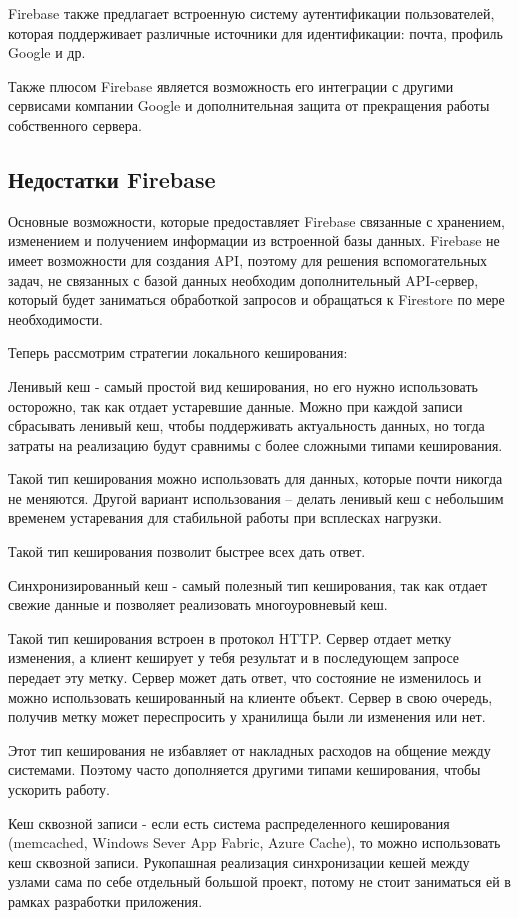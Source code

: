 Firebase также предлагает встроенную систему аутентификации пользователей, которая поддерживает различные источники для идентификации: почта, профиль Google и др.

Также плюсом Firebase является возможность его интеграции с другими сервисами компании Google и дополнительная защита от прекращения работы собственного сервера.

\subsection{Недостатки Firebase}
Основные возможности, которые предоставляет Firebase связанные с хранением, изменением и получением информации из встроенной базы данных. Firebase не имеет возможности для создания API, поэтому для решения вспомогательных задач, не связанных с базой данных необходим дополнительный API-cервер, который будет заниматься обработкой запросов и обращаться к Firestore по мере необходимости.

Теперь рассмотрим стратегии локального кеширования:

Ленивый кеш - самый простой вид кеширования, но его нужно использовать осторожно, так как отдает устаревшие данные. Можно при каждой записи сбрасывать ленивый кеш, чтобы поддерживать актуальность данных, но тогда затраты на реализацию будут сравнимы с более сложными типами кеширования.

Такой тип кеширования можно использовать для данных, которые почти никогда не меняются. Другой вариант использования – делать ленивый кеш с небольшим временем устаревания для стабильной работы при всплесках нагрузки.

Такой тип кеширования позволит быстрее всех дать ответ.

Синхронизированный кеш - самый полезный тип кеширования, так как отдает свежие данные и позволяет реализовать многоуровневый кеш.

Такой тип кеширования встроен в протокол HTTP. Сервер отдает метку изменения, а клиент кеширует у тебя результат и в последующем запросе передает эту метку. Сервер может дать ответ, что состояние не изменилось и можно использовать кешированный на клиенте объект. Сервер в свою очередь, получив метку может переспросить у хранилища были ли изменения или нет.

Этот тип кеширования не избавляет от накладных расходов на общение между системами. Поэтому часто дополняется другими типами кеширования, чтобы ускорить работу.

Кеш сквозной записи - если есть система распределенного кеширования (memcached, Windows Sever App Fabric, Azure Cache), то можно использовать кеш сквозной записи. Рукопашная реализация синхронизации кешей между узлами сама по себе отдельный большой проект, потому не стоит заниматься ей в рамках разработки приложения.

